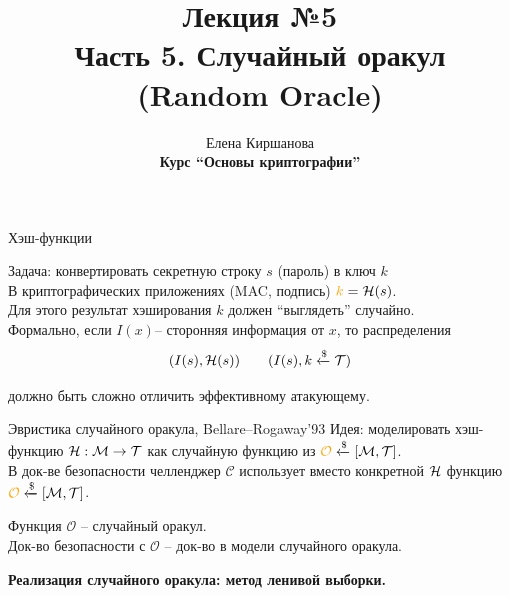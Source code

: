 \documentclass[usenames,dvipsnames,8pt,aspectratio=169]{beamer}
\title{Лекция №5 \\[10pt]
	Часть 5. Случайный оракул (Random Oracle)}
\date{ Елена Киршанова \\  \textbf{Курс ``Основы криптографии''} \\  }
\begin{document}
	
\begin{frame}
	\titlepage
\end{frame}

\begin{frame}{Хэш-функции }

	\LARGE
	 
	 {\color{Orange} Задача: } конвертировать секретную строку $s$ (пароль) в ключ {\color{Orange}$k$}  \\[8pt] 
	 
	В криптографических приложениях (MAC, подпись) ${\color{Orange}k} = \Hash(s)$.\\[8pt] 
	
	Для этого результат хэширования {\color{Orange}$k$} должен ``выглядеть'' случайно. \\[25pt] 
	
	Формально, если $I(x)$-- сторонняя информация от $x$, то распределения
	\[
		(I(s), \mathcal{H}(s))  \quad \quad 	(I(s), k \xleftarrow{\$} \mathcal{T})
	\]
	
	должно быть сложно отличить эффективному атакующему.
	
\end{frame}

\begin{frame}{Эвристика случайного оракула, Bellare--Rogaway'93}
\vspace{-60pt}
	\Large
	{\color{Orange} Идея:} моделировать хэш-функцию $\mathcal{H}: \mathcal{M} \rightarrow \mathcal{T}$ как {\color{Orange} случайную}  функцию из ${\color{Orange}\mathcal{O}} \xleftarrow{\$} \mathcal[\mesS, \mathcal{T}]$. \\[8pt]
	
	В док-ве безопасности челленджер {\color{Orange}$\mathcal{C}$} использует вместо {\color{Orange} конкретной} $\mathcal{H}$ функцию ${\color{Orange}\mathcal{O}}\xleftarrow{\$} \mathcal[\mesS, \mathcal{T}]$. \\[8pt]
	\begin{center}
		Функция {\color{Orange}$\mathcal{O}$} -- случайный оракул. \\[5pt]
		
		Док-во безопасности с  {\color{Orange}$\mathcal{O}$}  -- док-во в {\color{Orange} модели случайного оракула.}
		
	\end{center}

\textbf{Реализация случайного оракула: метод ленивой выборки.}
	

\end{frame}
\end{document}
